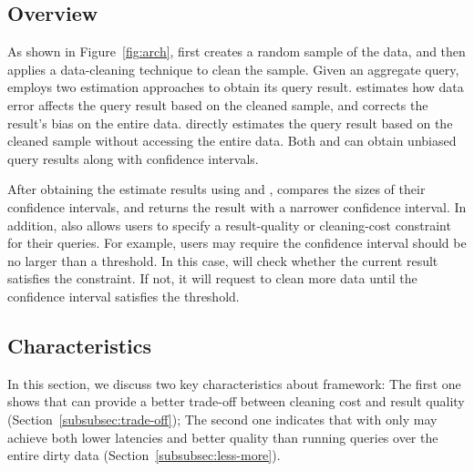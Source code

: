 \subsection{Overview}\label{subsec:new-paradigms}
As shown in Figure~\ref{fig:arch}, \saqpplus first creates a random sample of the data, and then applies a data-cleaning technique to clean the sample. Given an aggregate query, \saqpplus employs two estimation approaches to obtain its query result. \biascorrected estimates how data error affects the query result based on the cleaned sample, and  corrects the result's bias on the entire data. \sampleclean directly estimates the query result based on the cleaned sample without accessing the entire data. Both \biascorrected and \sampleclean can obtain unbiased query results along with confidence intervals.

After obtaining the estimate results using \sampleclean and \biascorrected, \saqpplus compares the sizes of their confidence intervals, and returns the result with a narrower confidence interval. In addition, \saqpplus also allows users to specify a result-quality or cleaning-cost constraint for their queries. For example, users may require the confidence interval should be no larger than a threshold. In this case, \saqpplus will check whether the current result satisfies the constraint. If not, it will request to clean more data until the confidence interval satisfies the threshold. 




\subsection{Characteristics}\label{subsec:characteristics}
In this section, we discuss two key characteristics about \saqpplus framework: The first one shows that \saqpplus can provide a better trade-off between cleaning cost and result quality (Section~\ref{subsubsec:trade-off}); The second one indicates that \saqpplus with only \sampleclean  may achieve both lower latencies and better quality than running queries over the entire dirty data (Section~\ref{subsubsec:less-more}).



